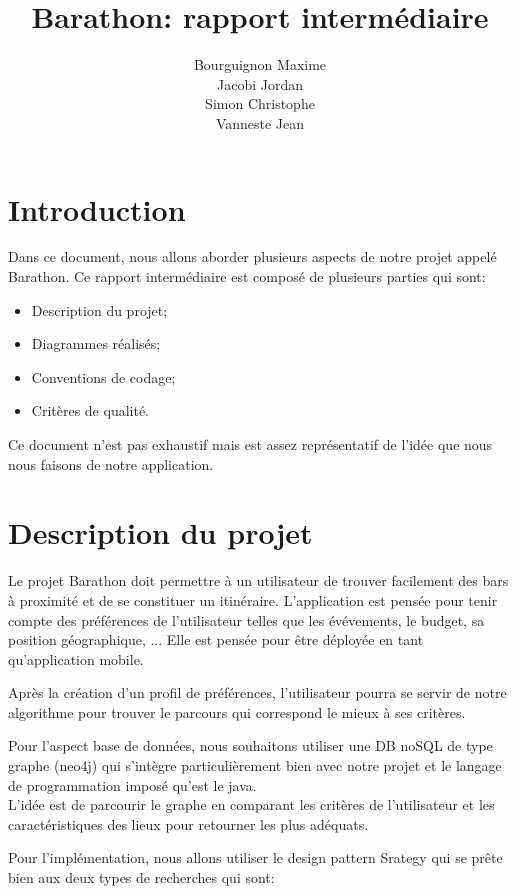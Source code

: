 \documentclass[a4paper,11pt]{article}
\title{Barathon: rapport intermédiaire}
\author{Bourguignon Maxime \\ Jacobi Jordan \\ Simon Christophe \\ Vanneste Jean}
\begin{document}
\maketitle


\section*{Introduction}

Dans ce document, nous allons aborder plusieurs aspects de notre projet appelé \og{} Barathon\fg{}. Ce rapport intermédiaire est composé de plusieurs parties qui sont:

\begin{itemize}
 \item Description du projet;
 \item Diagrammes réalisés;
 \item Conventions de codage;
 \item Critères de qualité.
\end{itemize}

Ce document n'est pas exhaustif mais est assez représentatif de l'idée que nous nous faisons de notre application.

\section{Description du projet}

Le projet \og{} Barathon \fg{} doit permettre à un utilisateur de trouver facilement des bars à proximité et de se constituer un itinéraire. L'application est pensée pour tenir compte des préférences de l'utilisateur telles que les évévements, le budget, sa position géographique, ... Elle est pensée pour être déployée en tant qu'application mobile.

Après la création d'un profil de préférences, l'utilisateur pourra se servir de notre algorithme pour trouver le parcours qui correspond le mieux à ses critères.

Pour l'aspect base de données, nous souhaitons utiliser une DB noSQL de type graphe (neo4j) qui s'intègre particulièrement bien avec notre projet et le langage de programmation imposé qu'est le java.\\
L'idée est de parcourir le graphe en comparant les critères de l'utilisateur et les caractéristiques des lieux pour retourner les plus adéquats.

Pour l'implémentation, nous allons utiliser le design pattern Srategy qui se prête bien aux deux types de recherches qui sont:
\newline
\end{document}
